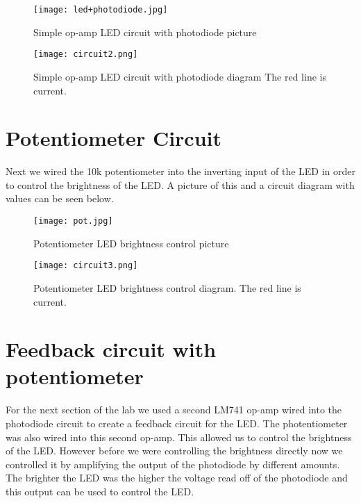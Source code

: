 \documentclass[prl,12pt,notitlepage,aps,onecolumn,superscriptaddress]{revtex4-1}
\begin{document}
\begin{figure}[H]
\begin{center}
\texttt{[image: led+photodiode.jpg]}
\end{center}
\caption{\label{fig:pic} Simple op-amp LED circuit with photodiode picture}
\end{figure}

\begin{figure}[H]
\begin{center}
\texttt{[image: circuit2.png]}
\end{center}
\caption{\label{fig:pic} Simple op-amp LED circuit with photodiode diagram The red line is current.}
\end{figure}

\section{Potentiometer Circuit}
Next we wired the 10k potentiometer into the inverting input of the LED in order to control the brightness of the LED. A picture of this and a circuit diagram with values can be seen below.

\begin{figure}[H]
\begin{center}
\texttt{[image: pot.jpg]}
\end{center}
\caption{\label{fig:pic} Potentiometer LED brightness control picture}
\end{figure}

\begin{figure}[H]
\begin{center}
\texttt{[image: circuit3.png]}
\end{center}
\caption{\label{fig:pic} Potentiometer LED brightness control diagram. The red line is current.}
\end{figure}

\section{Feedback circuit with potentiometer}
For the next section of the lab we used a second LM741 op-amp wired into the photodiode circuit to create a feedback circuit for the LED. The photentiometer was also wired into this second op-amp. This allowed us to control the brightness of the LED. However before we were controlling the brightness directly now we controlled it by amplifying the output of the photodiode by different amounts. The brighter the LED was the higher the voltage read off of the photodiode and this output can be used to control the LED.
\end{document}
